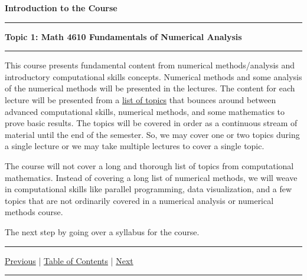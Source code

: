 \documentclass[10pt,fleqn]{article}
\begin{document}
\noindent
{\bf{\Large Introduction to the Course }}
\vskip0.1in\hrule\vskip0.1in
\noindent
{\bf Topic 1: Math 4610 Fundamentals of Numerical Analysis} 
\vskip0.1in\hrule\vskip0.1in \noindent
This course presents fundamental content from numerical methods/analysis and
introductory computational skills concepts. Numerical methods and some analysis
of the numerical methods will be presented in the lectures. The content for each
lecture will be presented from a
\href{../../toc/md/topic_toc.md}{list of topics} that bounces around between
advanced computational skills, numerical methods, and some mathematics to prove
basic results. The topics will be covered in order as a continuous stream of
material until the end of the semester. So, we may cover one or two topics
during a single lecture or we may take multiple lectures to cover a single
topic.

The course will not cover a long and thorough list of topics from computational
mathematics. Instead of covering a long list of numerical methods, we will weave
in computational skills like parallel programming, data visualization, and a few
topics that are not ordinarily covered in a numerical analysis or numerical
methods course.

The next step by going over a syllabus for the course.

\vskip0.1in\hrule\vskip0.1in \noindent
  \href{../../toc/md/topic_toc.md}{Previous} |
  \href{../../toc/md/topic_toc.md}{Table of Contents} |
  \href{../../topic_02/md/topic_02.md}{Next}
\vskip0.1in\hrule\vskip0.1in \noindent

\end{document}

